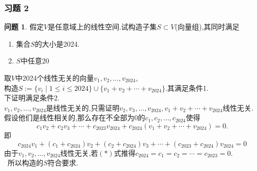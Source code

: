 \documentclass[11pt]{ctexart}
\theoremstyle{definition}
\newtheorem{qqq}{问题}[section]
\numberwithin{equation}{section}
\begin{document}
\subsubsection{习题 2}
\begin{qqq}
    假定$V$是任意域上的线性空间.试构造子集$S\subset V$(向量组),其同时满足
    \begin{enumerate}
        \item 集合$S$的大小是2024.
        \item $S$中任意20
    \end{enumerate}
\end{qqq}
\begin{aaa}
    取$V$中2024个线性无关的向量$v_1,v_2,\ldots,v_{2024}$,\\构造$S:=\{v_i\mid 1\leq i \leq 2024\}\cup \{v_1+v_2+\cdots +v_{2024}\}$.其满足条件1.\\下证明满足条件2.
    \\$v_1,v_2,\ldots,v_{2024} $是线性无关的,只需证明$v_2,v_3,\ldots,v_{2024},v_1+v_2+\cdots+v_{2024}$线性无关.\\
    假设他们是线性相关的,那么存在不全部为0的$c_1,c_2,\ldots ,c_{2024}$使得\[c_1v_2+c_2v_3+\cdots+c_{2023}v_{2024}+c_{2024}(v_1+v_2+\cdots+v_{2024})=0.\]
    即\begin{equation}c_{2024}v_1+(c_1+c_{2024})v_2+(c_2+c_{2024})v_3+\cdots +(c_{2023}+c_{2024})v_{2024}=0\tag{$\ast $}\end{equation}
    由于$v_1,v_2,\ldots,v_{2024}$线性无关,若$(\ast)$式推得$c_{2024}=c_1=c_2=\cdots=c_{2023}=0$.\\\
    所以构造的$S$符合要求.
\end{aaa}
\end{document}

